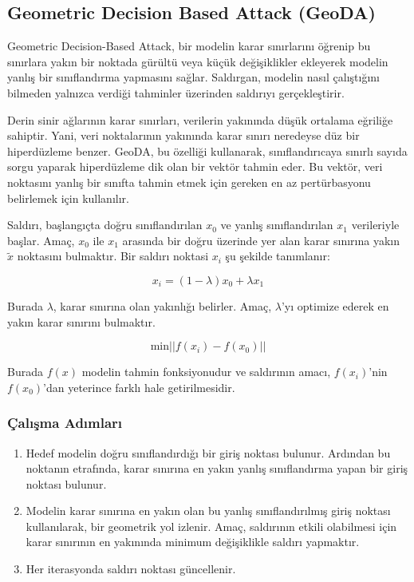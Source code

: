 \newpage

\subsection{Geometric Decision Based Attack (GeoDA)}

Geometric Decision-Based Attack, bir modelin karar sınırlarını öğrenip bu sınırlara yakın bir noktada gürültü veya küçük değişiklikler ekleyerek modelin yanlış bir sınıflandırma yapmasını sağlar. Saldırgan, modelin nasıl çalıştığını bilmeden yalnızca verdiği tahminler üzerinden saldırıyı gerçekleştirir.

Derin sinir ağlarının karar sınırları, verilerin yakınında düşük ortalama eğriliğe sahiptir. Yani, veri noktalarının yakınında karar sınırı neredeyse düz bir hiperdüzleme benzer. GeoDA, bu özelliği kullanarak, sınıflandırıcaya sınırlı sayıda sorgu yaparak hiperdüzleme dik olan bir vektör tahmin eder. Bu vektör, veri noktasını yanlış bir sınıfta tahmin etmek için gereken en az pertürbasyonu belirlemek için kullanılır.

Saldırı, başlangıçta doğru sınıflandırılan $x_0$ ve yanlış sınıflandırılan $x_1$ verileriyle başlar. Amaç, $x_0$ ile $x_1$ arasında bir doğru üzerinde yer alan karar sınırına yakın $\tilde{x}$ noktasını bulmaktır. Bir saldırı noktasi $x_i$ şu şekilde tanımlanır:

\[ x_i  = (1 - \lambda) x_0 + \lambda x_1 \]

Burada $\lambda$, karar sınırına olan yakınlığı belirler. Amaç, $\lambda$'yı optimize ederek en yakın karar sınırını bulmaktır.

\[ \text{min} || f(x_i) - f(x_0) || \]

Burada $f(x)$ modelin tahmin fonksiyonudur ve saldırının amacı, $f(x_i)$'nin $f(x_0)$'dan yeterince farklı hale getirilmesidir.

\subsubsection{Çalışma Adımları}

\begin{enumerate}
    \item Hedef modelin doğru sınıflandırdığı bir giriş noktası bulunur. Ardından bu noktanın etrafında, karar sınırına en yakın yanlış sınıflandırma yapan bir giriş noktası bulunur.
    \item Modelin karar sınırına en yakın olan bu yanlış sınıflandırılmış giriş noktası kullanılarak, bir geometrik yol izlenir. Amaç, saldırının etkili olabilmesi için karar sınırının en yakınında minimum değişiklikle saldırı yapmaktır.
    \item Her iterasyonda saldırı noktası güncellenir.
\end{enumerate}

